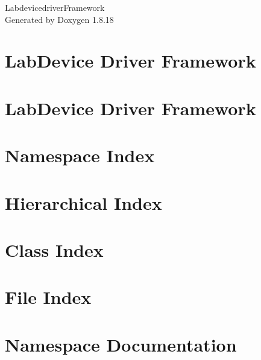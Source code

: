 \let\mypdfximage\pdfximage\def\pdfximage{\immediate\mypdfximage}\documentclass[twoside]{book}
\newcommand{\+}{\discretionary{\mbox{\scriptsize$\hookleftarrow$}}{}{}}
\newcommand{\clearemptydoublepage}{%
  \newpage{\pagestyle{empty}\cleardoublepage}%
}
\begin{document}
\hypersetup{pageanchor=false,
             bookmarksnumbered=true,
             pdfencoding=unicode
            }
\begin{titlepage}
\vspace*{7cm}
\begin{center}%
{\Large Labdevicedriver\+Framework }\\
\vspace*{1cm}
{\large Generated by Doxygen 1.8.18}\\
\end{center}
\end{titlepage}
\clearemptydoublepage
{}
\tableofcontents
\clearemptydoublepage
{}
\hypersetup{pageanchor=true}

\chapter{Lab\+Device Driver Framework}
\label{index}\hypertarget{index}{}
\chapter{Lab\+Device Driver Framework}
\label{md__home_thomas__h_f-_lab_labdevicedrivers__r_e_a_d_m_e}

\chapter{Namespace Index}

\chapter{Hierarchical Index}

\chapter{Class Index}

\chapter{File Index}

\chapter{Namespace Documentation}




\end{document}
